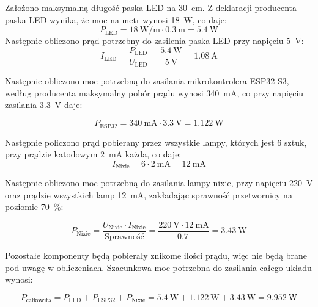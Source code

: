 \documentclass[../main.tex]{subfiles}
\begin{document}
Założono maksymalną długość paska LED na \SI{30}{\centi\meter}. Z deklaracji producenta paska LED wynika, że moc na metr wynosi \SI{18}{\watt}, co daje:
\begin{equation}
    P_{\text{LED}} = \SI{18}{\watt\per\meter} \cdot \SI{0.3}{\meter} = \SI{5.4}{\watt}
\end{equation}
Następnie obliczono prąd potrzebny do zasilenia paska LED przy napięciu \SI{5}{\volt}:
\begin{equation}
    I_{\text{LED}} = \frac{P_{\text{LED}}}{U_{\text{LED}}} = \frac{\SI{5.4}{\watt}}{\SI{5}{\volt}} = \SI{1.08}{\ampere}
\end{equation}

Następnie obliczono moc potrzebną do zasilania mikrokontrolera ESP32-S3, według producenta maksymalny pobór prądu wynosi \SI{340}{\milli\ampere},
co przy napięciu zasilania \SI{3.3}{\volt} daje:

\begin{equation}
    P_{\text{ESP32}} = \SI{340}{\milli\ampere} \cdot \SI{3.3}{\volt} = \SI{1.122}{\watt}
\end{equation}

Następnie policzono prąd pobierany przez wszystkie lampy, których jest 6 sztuk, przy prądzie katodowym \SI{2}{\milli\ampere} każda, co daje:
\begin{equation}
    I_{\text{Nixie}} = 6 \cdot \SI{2}{\milli\ampere} = \SI{12}{\milli\ampere}
\end{equation}

Następnie obliczono moc potrzebną do zasilania lampy nixie, przy napięciu \SI{220}{\volt} oraz prądzie wszystkich lamp \SI{12}{\milli\ampere}, zakładając 
sprawność przetwornicy na poziomie \SI{70}{\percent}:

\begin{equation}
    P_{\text{Nixie}} = \frac{U_{\text{Nixie}} \cdot I_{\text{Nixie}}}{\text{Sprawność}} = \frac{\SI{220}{\volt} \cdot \SI{12}{\milli\ampere}}{\SI{0.7}{}} = \SI{3.43}{\watt}
\end{equation}

Pozostałe komponenty będą pobierały znikome ilości prądu, więc nie będą brane pod uwagę w obliczeniach.
Szacunkowa moc potrzebna do zasilania całego układu wynosi:

\begin{equation}
    P_{\text{całkowita}} = P_{\text{LED}} + P_{\text{ESP32}} + P_{\text{Nixie}} = \SI{5.4}{\watt} + \SI{1.122}{\watt} + \SI{3.43}{\watt} = \SI{9.952}{\watt}
\end{equation}
\end{document}
